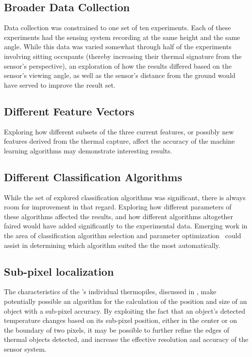 \documentclass[../thesis/thesis.tex]{subfiles}
\begin{document}
\subsection{Broader Data Collection}
Data collection was constrained to one set of ten experiments. Each of these experiments had the sensing system recording at the same height and the same angle. While this data was varied somewhat through half of the experiments involving sitting occupants (thereby increasing their thermal signature from the sensor's perspective), an exploration of how the results differed based on the sensor's viewing angle, as well as the sensor's distance from the ground would have served to improve the result set.

\subsection{Different Feature Vectors}
Exploring how different subsets of the three current features, or possibly new features derived from the thermal capture, affect the accuracy of the machine learning algorithms may demonstrate interesting results. %

\subsection{Different Classification Algorithms}
While the set of explored classification algorithms was significant, there is always room for improvement in that regard. Exploring how different parameters of these algorithms affected the results, and how different algorithms altogether faired would have added significantly to the experimental data. Emerging work in the area of classification algorithm selection and parameter optimization~\cite{thornton2013auto} could assist in determining which algorithm suited the \mlx the most automatically.

\subsection{Sub-pixel localization}
The  characteristics of the \mlx's individual thermopiles, discussed in , make potentially possible an algorithm for the calculation of the position and size of an object with a sub-pixel accuracy. By exploiting the fact that an object's detected temperature changes based on its sub-pixel position, either in the center or on the boundary of two pixels, it may be possible to further refine the edges of thermal objects detected, and increase the effective resolution and accuracy of the sensor system.
\end{document}

